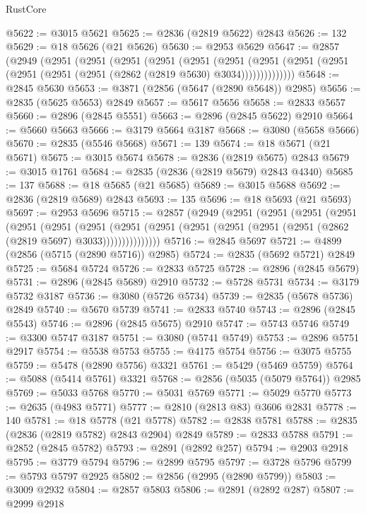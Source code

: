 \begin{lexlean}{RustCore}
\begin{coremodule}
@5622 := @3015 @5621
@5625 := @2836 (@2819 @5622) @2843
@5626 := 132
@5629 := @18 @5626 (@21 @5626)
@5630 := @2953 @5629
@5647 := @2857
    (@2949
      (@2951
        (@2951
          (@2951
            (@2951
              (@2951
                (@2951
                  (@2951 (@2951 (@2951 (@2951 (@2951 (@2951 (@2862 (@2819 @5630) @3034))))))))))))))
@5648 := @2845 @5630
@5653 := @3871 (@2856 (@5647 (@2890 @5648)) @2985)
@5656 := @2835 (@5625 @5653) @2849
@5657 := @5617 @5656
@5658 := @2833 @5657
@5660 := @2896 (@2845 @5551)
@5663 := @2896 (@2845 @5622) @2910
@5664 := @5660 @5663
@5666 := @3179 @5664 @3187
@5668 := @3080 (@5658 @5666)
@5670 := @2835 (@5546 @5668)
@5671 := 139
@5674 := @18 @5671 (@21 @5671)
@5675 := @3015 @5674
@5678 := @2836 (@2819 @5675) @2843
@5679 := @3015 @1761
@5684 := @2835 (@2836 (@2819 @5679) @2843 @4340)
@5685 := 137
@5688 := @18 @5685 (@21 @5685)
@5689 := @3015 @5688
@5692 := @2836 (@2819 @5689) @2843
@5693 := 135
@5696 := @18 @5693 (@21 @5693)
@5697 := @2953 @5696
@5715 := @2857
    (@2949
      (@2951
        (@2951
          (@2951
            (@2951
              (@2951
                (@2951
                  (@2951
                    (@2951
                      (@2951 (@2951 (@2951 (@2951 (@2951 (@2862 (@2819 @5697) @3033)))))))))))))))
@5716 := @2845 @5697
@5721 := @4899 (@2856 (@5715 (@2890 @5716)) @2985)
@5724 := @2835 (@5692 @5721) @2849
@5725 := @5684 @5724
@5726 := @2833 @5725
@5728 := @2896 (@2845 @5679)
@5731 := @2896 (@2845 @5689) @2910
@5732 := @5728 @5731
@5734 := @3179 @5732 @3187
@5736 := @3080 (@5726 @5734)
@5739 := @2835 (@5678 @5736) @2849
@5740 := @5670 @5739
@5741 := @2833 @5740
@5743 := @2896 (@2845 @5543)
@5746 := @2896 (@2845 @5675) @2910
@5747 := @5743 @5746
@5749 := @3300 @5747 @3187
@5751 := @3080 (@5741 @5749)
@5753 := @2896 @5751 @2917
@5754 := @5538 @5753
@5755 := @4175 @5754
@5756 := @3075 @5755
@5759 := @5478 (@2890 @5756) @3321
@5761 := @5429 (@5469 @5759)
@5764 := @5088 (@5414 @5761) @3321
@5768 := @2856 (@5035 (@5079 @5764)) @2985
@5769 := @5033 @5768
@5770 := @5031 @5769
@5771 := @5029 @5770
@5773 := @2635 (@4983 @5771)
@5777 := @2810 (@2813 @83) @3606 @2831
@5778 := 140
@5781 := @18 @5778 (@21 @5778)
@5782 := @2838 @5781
@5788 := @2835 (@2836 (@2819 @5782) @2843 @2904) @2849
@5789 := @2833 @5788
@5791 := @2852 (@2845 @5782)
@5793 := @2891 (@2892 @257)
@5794 := @2903 @2918
@5795 := @3779 @5794
@5796 := @2899 @5795
@5797 := @3728 @5796
@5799 := @5793 @5797 @2925
@5802 := @2856 (@2995 (@2890 @5799))
@5803 := @3009 @2932
@5804 := @2857 @5803
@5806 := @2891 (@2892 @287)
@5807 := @2999 @2918

\end{coremodule}
\end{lexlean}
